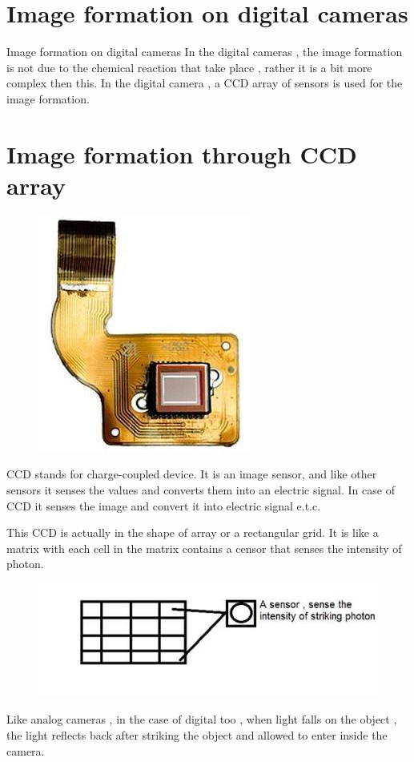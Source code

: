 \documentclass[a4paper]{article}
\begin{document}
\newpage
  \section{Image formation on digital cameras
}
  Image formation on digital cameras
In the digital cameras , the image formation is not due to the chemical reaction that take place , rather it is a bit more complex then this. In the digital camera , a CCD array of sensors is used for the image formation.

\section{Image formation through CCD array}
  \begin{figure}[h]
  \centering
  \includegraphics{uu}
  \end{figure}
  CCD stands for charge-coupled device. It is an image sensor, and like other sensors it senses the values and converts them into an electric signal. In case of CCD it senses the image and convert it into electric signal e.t.c.

This CCD is actually in the shape of array or a rectangular grid. It is like a matrix with each cell in the matrix contains a censor that senses the intensity of photon.

\begin{figure}[h]
\centering
\includegraphics{tt}
\end{figure}
Like analog cameras , in the case of digital too , when light falls on the object , the light reflects back after striking the object and allowed to enter inside the camera.
\end{document}
